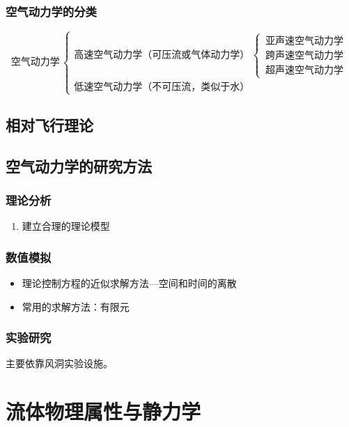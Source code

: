 \subsection{空气动力学的分类}
\begin{equation*}
	\mbox{空气动力学}\, 
	\begin{cases}
		\mbox{高速空气动力学（可压流或气体动力学）} \,
		\begin{cases}
			\, \mbox{亚声速空气动力学}\\
			\, \mbox{跨声速空气动力学}\\
			\, \mbox{超声速空气动力学}
		\end{cases}\\
	\mbox{低速空气动力学（不可压流，类似于水）}
	\end{cases}
\end{equation*}

\section{相对飞行理论}

\section{空气动力学的研究方法}
\subsection{理论分析}
\begin{enumerate}
	\item 建立合理的理论模型
\end{enumerate}
\subsection{数值模拟}
\begin{itemize}
	\item 理论控制方程的近似求解方法—空间和时间的离散
	\item 常用的求解方法：有限元
\end{itemize}
\subsection{实验研究}
主要依靠风洞实验设施。




\chapter{流体物理属性与静力学}

